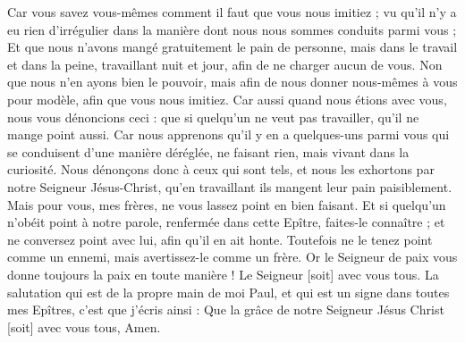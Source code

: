 \begin{multicols}{2}
Car vous savez vous-mêmes comment il faut que vous nous imitiez ; vu qu'il n'y a eu rien d'irrégulier dans la manière dont nous nous sommes conduits parmi vous ;
Et que nous n'avons mangé gratuitement le pain de personne, mais dans le travail et dans la peine, travaillant nuit et jour, afin de ne charger aucun de vous.
Non que nous n'en ayons bien le pouvoir, mais afin de nous donner nous-mêmes à vous pour modèle, afin que vous nous imitiez.
Car aussi quand nous étions avec vous, nous vous dénoncions ceci : que si quelqu'un ne veut pas travailler, qu'il ne mange point aussi.
Car nous apprenons qu'il y en a quelques-uns parmi vous qui se conduisent d'une manière déréglée, ne faisant rien, mais vivant dans la curiosité.
Nous dénonçons donc à ceux qui sont tels, et nous les exhortons par notre Seigneur Jésus-Christ, qu'en travaillant ils mangent leur pain paisiblement.
Mais pour vous, mes frères, ne vous lassez point en bien faisant.
Et si quelqu'un n'obéit point à notre parole, renfermée dans cette Epître, faites-le connaître ; et ne conversez point avec lui, afin qu'il en ait honte.
Toutefois ne le tenez point comme un ennemi, mais avertissez-le comme un frère.
Or le Seigneur de paix vous donne toujours la paix en toute manière ! Le Seigneur [soit] avec vous tous.
La salutation qui est de la propre main de moi Paul, et qui est un signe dans toutes mes Epîtres, c'est que j'écris ainsi :
Que la grâce de notre Seigneur Jésus Christ [soit] avec vous tous, Amen.
\PPE{}
\end{multicols}
